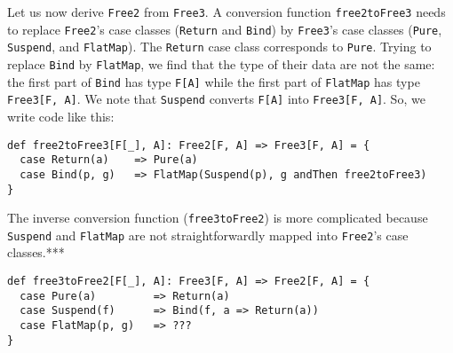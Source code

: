 Let us now derive \lstinline!Free2!
from \lstinline!Free3!.
A conversion function \lstinline!free2toFree3!
needs to replace \lstinline!Free2!\textsf{'}s
case classes (\lstinline!Return!
and \lstinline!Bind!) by
\lstinline!Free3!\textsf{'}s case
classes (\lstinline!Pure!,
\lstinline!Suspend!, and
\lstinline!FlatMap!). The
\lstinline!Return! case
class corresponds to \lstinline!Pure!.
Trying to replace \lstinline!Bind!
by \lstinline!FlatMap!,
we find that the type of their data are not the same: the first part
of \lstinline!Bind! has
type \lstinline!F[A]! while
the first part of \lstinline!FlatMap!
has type \lstinline!Free3[F, A]!.
We note that \lstinline!Suspend!
converts \lstinline!F[A]!
into \lstinline!Free3[F, A]!.
So, we write code like this:
\begin{lstlisting}
def free2toFree3[F[_], A]: Free2[F, A] => Free3[F, A] = {
  case Return(a)    => Pure(a)
  case Bind(p, g)   => FlatMap(Suspend(p), g andThen free2toFree3)
}
\end{lstlisting}
The inverse conversion function (\lstinline!free3toFree2!)
is more complicated because \lstinline!Suspend!
and \lstinline!FlatMap!
are not straightforwardly mapped into \lstinline!Free2!\textsf{'}s
case classes.{*}{*}{*}
\begin{lstlisting}
def free3toFree2[F[_], A]: Free3[F, A] => Free2[F, A] = {
  case Pure(a)         => Return(a)
  case Suspend(f)      => Bind(f, a => Return(a))
  case FlatMap(p, g)   => ???
}
\end{lstlisting}

